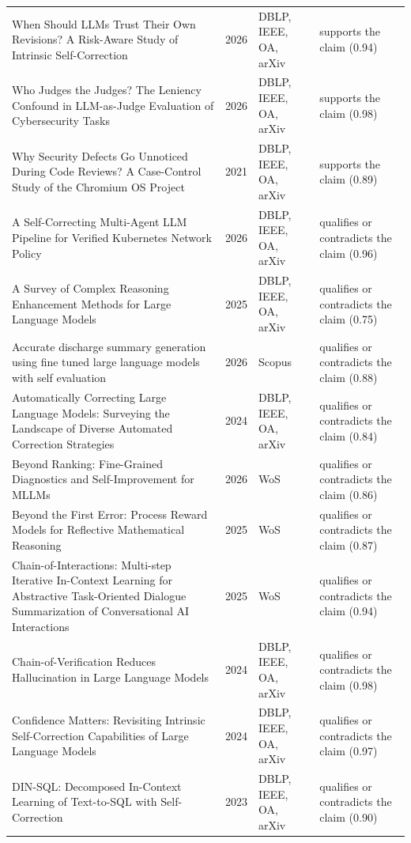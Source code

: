 \begin{longtable}{@{}%
  >{\raggedright\arraybackslash}p{}c%
  >{\raggedright\arraybackslash}p{}%
  >{\raggedright\arraybackslash}p{}@{}}
When Should LLMs Trust Their Own Revisions? A Risk-Aware Study of Intrinsic Self-Correction & 2026 & DBLP, IEEE, OA, arXiv & supports the claim (0.94) \\
Who Judges the Judges? The Leniency Confound in LLM-as-Judge Evaluation of Cybersecurity Tasks & 2026 & DBLP, IEEE, OA, arXiv & supports the claim (0.98) \\
Why Security Defects Go Unnoticed During Code Reviews? A Case-Control Study of the Chromium OS Project & 2021 & DBLP, IEEE, OA, arXiv & supports the claim (0.89) \\
A Self-Correcting Multi-Agent LLM Pipeline for Verified Kubernetes Network Policy & 2026 & DBLP, IEEE, OA, arXiv & qualifies or contradicts the claim (0.96) \\
A Survey of Complex Reasoning Enhancement Methods for Large Language Models & 2025 & DBLP, IEEE, OA, arXiv & qualifies or contradicts the claim (0.75) \\
Accurate discharge summary generation using fine tuned large language models with self evaluation & 2026 & Scopus & qualifies or contradicts the claim (0.88) \\
Automatically Correcting Large Language Models: Surveying the Landscape of Diverse Automated Correction Strategies & 2024 & DBLP, IEEE, OA, arXiv & qualifies or contradicts the claim (0.84) \\
Beyond Ranking: Fine-Grained Diagnostics and Self-Improvement for MLLMs & 2026 & WoS & qualifies or contradicts the claim (0.86) \\
Beyond the First Error: Process Reward Models for Reflective Mathematical Reasoning & 2025 & WoS & qualifies or contradicts the claim (0.87) \\
Chain-of-Interactions: Multi-step Iterative In-Context Learning for Abstractive Task-Oriented Dialogue Summarization of Conversational AI Interactions & 2025 & WoS & qualifies or contradicts the claim (0.94) \\
Chain-of-Verification Reduces Hallucination in Large Language Models & 2024 & DBLP, IEEE, OA, arXiv & qualifies or contradicts the claim (0.98) \\
Confidence Matters: Revisiting Intrinsic Self-Correction Capabilities of Large Language Models & 2024 & DBLP, IEEE, OA, arXiv & qualifies or contradicts the claim (0.97) \\
DIN-SQL: Decomposed In-Context Learning of Text-to-SQL with Self-Correction & 2023 & DBLP, IEEE, OA, arXiv & qualifies or contradicts the claim (0.90) \\

\end{longtable}
